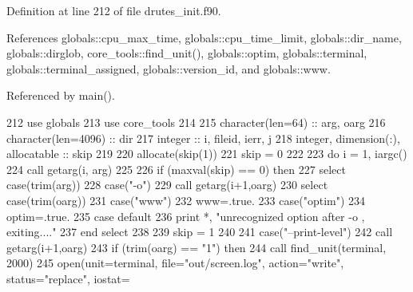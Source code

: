 Definition at line 212 of file drutes\+\_\+init.\+f90.



References globals\+::cpu\+\_\+max\+\_\+time, globals\+::cpu\+\_\+time\+\_\+limit, globals\+::dir\+\_\+name, globals\+::dirglob, core\+\_\+tools\+::find\+\_\+unit(), globals\+::optim, globals\+::terminal, globals\+::terminal\+\_\+assigned, globals\+::version\+\_\+id, and globals\+::www.



Referenced by main().


\begin{DoxyCode}
212       \textcolor{keywordtype}{use }globals
213       \textcolor{keywordtype}{use }core_tools
214       
215       \textcolor{keywordtype}{character(len=64)} :: arg, oarg
216       \textcolor{keywordtype}{character(len=4096)} :: dir
217       \textcolor{keywordtype}{integer} :: i, fileid, ierr, j
218       \textcolor{keywordtype}{integer},  \textcolor{keywordtype}{dimension(:)}, \textcolor{keywordtype}{allocatable} :: skip 
219       
220       \textcolor{keyword}{allocate}(skip(1))
221       skip = 0
222       
223       \textcolor{keywordflow}{do} i = 1, iargc()
224         \textcolor{keyword}{call }getarg(i, arg)
225       
226         \textcolor{keywordflow}{if} (maxval(skip) == 0) \textcolor{keywordflow}{then}
227           \textcolor{keywordflow}{select case}(trim(arg))
228             \textcolor{keywordflow}{case}(\textcolor{stringliteral}{"-o"})
229                     \textcolor{keyword}{call }getarg(i+1,oarg)
230                     \textcolor{keywordflow}{select case}(trim(oarg))
231                       \textcolor{keywordflow}{case}(\textcolor{stringliteral}{"www"})
232                         www=.true.
233                       \textcolor{keywordflow}{case}(\textcolor{stringliteral}{"optim"})
234                         optim=.true.
235 \textcolor{keywordflow}{                      case default}
236                         print *, \textcolor{stringliteral}{"unrecognized option after -o , exiting...."}
237 \textcolor{keywordflow}{                    end select}
238 
239                     skip = 1
240                     
241             \textcolor{keywordflow}{case}(\textcolor{stringliteral}{"--print-level"})
242                     \textcolor{keyword}{call }getarg(i+1,oarg)
243                     \textcolor{keywordflow}{if} (trim(oarg) == \textcolor{stringliteral}{"1"}) \textcolor{keywordflow}{then}
244                       \textcolor{keyword}{call }find_unit(terminal, 2000)
245                       \textcolor{keyword}{open}(unit=terminal, file=\textcolor{stringliteral}{"out/screen.log"}, action=\textcolor{stringliteral}{"write"}, status\textcolor{comment}{=}\textcolor{stringliteral}{"replace"}\textcolor{comment}{, iostat=
}
\end{DoxyCode}
